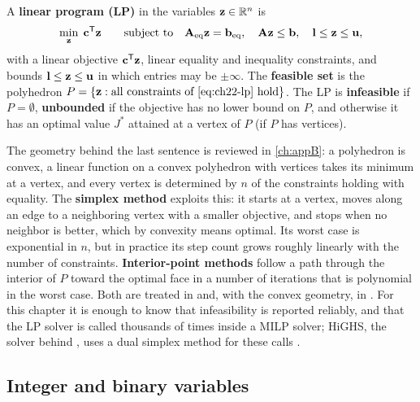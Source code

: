 \begin{definition}
\label{def:ch22-lp}
A \textbf{linear program (LP)} in the
variables $\mathbf{z} \in \mathbb{R}^n$ is
\begin{equation}
  \min_{\mathbf{z}} \; \mathbf{c}^{\mathsf{T}} \mathbf{z}
  \qquad \text{subject to}\quad \mathbf{A}_{\mathrm{eq}}\mathbf{z} = \mathbf{b}_{\mathrm{eq}}, \quad
  \mathbf{A}\mathbf{z} \le \mathbf{b}, \quad
  \mathbf{l} \le \mathbf{z} \le \mathbf{u},
  \label{eq:ch22-lp}
\end{equation}
with a linear objective $\mathbf{c}^{\mathsf{T}}\mathbf{z}$, linear equality and inequality
constraints, and bounds $\mathbf{l} \le \mathbf{z} \le \mathbf{u}$ in which
entries may be $\pm\infty$. The \textbf{feasible set} is the polyhedron
$P = \set{\vect{z} : \text{all constraints of \cref{eq:ch22-lp} hold}}$.
The LP is \textbf{infeasible} if $P = \emptyset$, \textbf{unbounded} if the
objective has no lower bound on $P$, and otherwise it has an optimal value
$J^*$ attained at a vertex of $P$ (if $P$ has vertices).
\end{definition}

The geometry behind the last sentence is reviewed in \cref{ch:appB}: a
polyhedron is convex, a linear function on a convex polyhedron with vertices
takes its minimum at a vertex, and every vertex is determined by $n$ of the
constraints holding with equality. The \textbf{simplex method} exploits this: it starts at a vertex, moves along an edge to a
neighboring vertex with a smaller objective, and stops when no neighbor is
better, which by convexity means optimal. Its worst case is exponential in
$n$, but in practice its step count grows roughly linearly with the number
of constraints. \textbf{Interior-point methods}
follow a path through the interior of $P$ toward the optimal face in a
number of iterations that is polynomial in the worst case. Both are treated
in \textcite{nocedal2006numerical} and, with the convex geometry, in
\textcite{boyd2004convex}. For this chapter it is enough to know that infeasibility
is reported reliably, and that the LP solver is called thousands of times
inside a MILP solver; HiGHS, the solver behind ,
uses a dual simplex method for these calls \cite{huangfu2018parallelizing}.

\subsection{Integer and binary variables}
\label{sec:ch22-integer}

